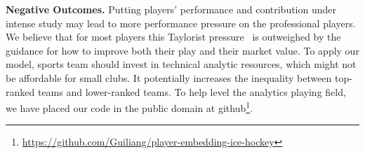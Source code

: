 \documentclass{article}
\begin{document}
{\bf Negative Outcomes.} Putting players' performance and contribution under intense study may lead to more performance pressure on the professional players. We believe that for most players this Taylorist pressure~\cite{bib:taylorism} is outweighed by the guidance for how to improve both their play and their market value. To apply our model, sports team should invest in technical analytic resources, which might not be affordable for small clubs. It potentially increases the inequality between top-ranked teams and lower-ranked teams. To help level the analytics playing field, we have placed our code in the public domain at github\footnote{\url{https://github.com/Guiliang/player-embedding-ice-hockey}}.




\end{document}
